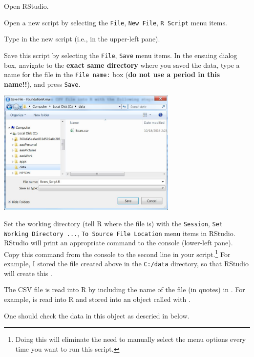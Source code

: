 \documentclass[10pt,openany]{book}\usepackage[]{graphicx}\usepackage[]{color}
\begin{document}
\begin{Itemize}
  \item Open RStudio.
  \item Open a new script by selecting the \verb"File", \verb"New File", \verb"R Script" menu items.
  \item Type  in the new script (i.e., in the upper-left pane).
  \item Save this script by selecting the \verb"File", \verb"Save" menu items. In the ensuing dialog box, navigate to the \textbf{exact same directory} where you saved the data, type a name for the file in the \verb"File name:" box (\textbf{do not use a period in this name!!}), and press \verb"Save".

\begin{center}
  \includegraphics[width=3.5in]{Figs/Data_File_3.jpg}
\end{center}

  \item Set the working directory (tell R where the file is) with the \verb"Session", \verb"Set Working Directory ...", \verb"To Source File Location" menu items in RStudio. RStudio will print an appropriate  command to the console (lower-left pane). Copy this command from the console to the second line in your script.\footnote{Doing this will eliminate the need to manually select the menu options every time you want to run this script.}  For example, I stored the file created above in the \verb"C:/data" directory, so that RStudio will create this .
  \item The CSV file is read into R by including the name of the file (in quotes) in . For example,  is read into R and stored into an object called  with .


  \item One should check the data in this object as descried in  below.
\end{Itemize}
\end{document}
